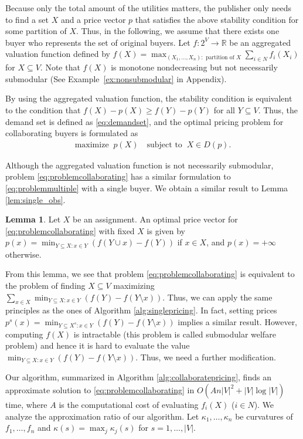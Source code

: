\documentclass[letterpaper]{article}
\theoremstyle{definition}
\newtheorem{lemma}[theorem]{Lemma}
\begin{document}
Because only the total amount of the utilities matters, the publisher only needs to find a set $X$ and a price vector $p$ that satisfies the above stability condition for some partition of $X$.
Thus, in the following, we assume that there exists one buyer who
represents the set of original buyers.
Let $f: 2^V \to \mathbb{R}$ be an aggregated valuation function defined by
$f(X) = \max_{(X_1,\dots,X_n):\text{ partition of } X}  \sum_{i\in N}f_i(X_i)$
for $X \subseteq V$.
Note that $f(X)$ is monotone nondecreasing but not necessarily submodular %
(See Example~\ref{ex:nonsubmodular} in Appendix).


By using the aggregated valuation function,
the stability condition is equivalent to the condition that $ f(X) - p(X) \ge f(Y) - p(Y)$
for all $Y \subseteq V$.
Thus, the demand set is defined as \eqref{eq:demandset}, and the optimal pricing problem for collaborating buyers is formulated as
\begin{align}
  \label{eq:problemcollaborating}
    \text{maximize} \; \; p(X) \quad
    \text{subject to} \; \; X \in D(p).
\end{align}

Although the aggregated valuation function
is not necessarily submodular, problem \eqref{eq:problemcollaborating} has a similar formulation to \eqref{eq:problemmultiple} with a single buyer.
We obtain a similar result to Lemma \ref{lem:single_obs}.
\begin{lemma}\label{lem:collaborating_obs}
Let $X$ be an assignment.
An optimal price vector for \eqref{eq:problemcollaborating} with fixed $X$ is given by
$p(x) =  \min_{Y\subseteq X: x\in Y}(f(Y\cup x) - f(Y))$ if $x \in X$, and $p(x) = +\infty$ otherwise.
\end{lemma}

From this lemma, we see that problem \eqref{eq:problemcollaborating} is equivalent to the problem of finding $X \subseteq V$ maximizing $\sum_{x \in X} \min_{Y\subseteq X: x\in Y}(f(Y) - f(Y \setminus x))$.
Thus, we can apply the same principles as the ones of Algorithm \ref{alg:singlepricing}.
In fact, setting prices $p^s(x)=\min_{Y\subseteq X^s: x\in Y}(f(Y)-f(Y\setminus x))$ implies a similar result.
However, computing $f(X)$ is intractable (this problem is called submodular welfare problem)
and hence
it is hard to evaluate the value \(\min_{Y\subseteq X: x\in Y}(f(Y)-f(Y\setminus x))\).
Thus, we need a further modification.


Our algorithm, summarized in Algorithm \ref{alg:collaboratepricing},
finds an approximate solution to \eqref{eq:problemcollaborating}
in $O(A n |V|^2 + |V| \log |V|)$ time,
where $A$ is the computational cost of evaluating $f_i(X)$ ($i \in N$).
We analyze the approximation ratio of our algorithm.
Let $\kappa_1, \ldots, \kappa_n$ be curvatures of $f_1, \ldots, f_n$
and \(\kappa(s) = \max_j \kappa_j (s)\) for $s=1,\dots,|V|$.
\end{document}
